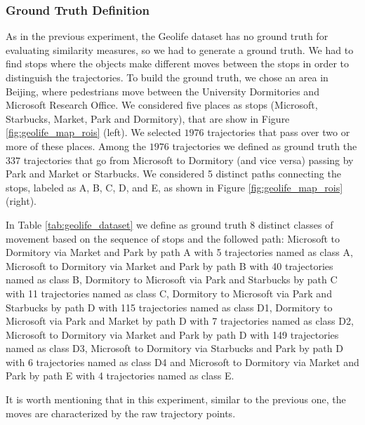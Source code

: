 \subsubsection{Ground Truth Definition}
{As in the previous experiment, the Geolife dataset has no ground truth for evaluating similarity measures, so we had to generate a ground truth. We had to find stops where the objects make different moves between the stops in order to distinguish the trajectories.}
To build the ground truth, we chose an area in Beijing, where pedestrians move between the University Dormitories and Microsoft Research Office. We considered five places as stops (Microsoft, Starbucks, Market, Park and Dormitory), that are show in Figure \ref{fig:geolife_map_rois} (left). {We selected $1976$ trajectories that pass over two or more of these places. Among the $1976$ trajectories we defined as ground truth the $337$ trajectories that go from Microsoft to Dormitory (and vice versa) passing by Park and Market or Starbucks.} We considered 5 distinct paths connecting the stops, labeled as A, B, C, D, and E, as shown in Figure \ref{fig:geolife_map_rois} (right).

In Table \ref{tab:geolife_dataset} we define as ground truth 8 distinct classes of movement based on the sequence of stops and the followed path: Microsoft to Dormitory via Market and Park by path A with 5 trajectories named as class A, Microsoft to Dormitory via Market and Park by path B with 40 trajectories named as class B, Dormitory to Microsoft via Park and Starbucks by path C with 11 trajectories named as class C, Dormitory to Microsoft via Park and Starbucks by path D with 115 trajectories named as class D1, Dormitory to Microsoft via Park and Market by path D with 7 trajectories named as class D2, Microsoft to Dormitory via Market and Park by path D with 149 trajectories named as class D3, Microsoft to Dormitory via Starbucks and Park by path D with 6 trajectories named as class D4 and Microsoft to Dormitory via Market and Park by path E with 4 trajectories named as class E.

It is worth mentioning that in this experiment, similar to the previous one, the moves are characterized by the raw trajectory points.

